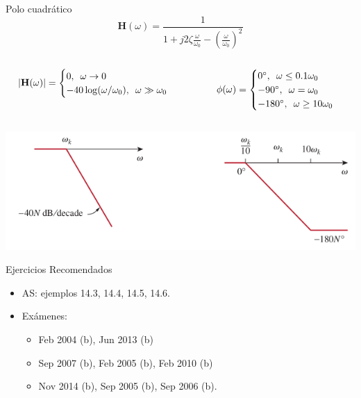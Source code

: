 \documentclass[aspectratio=169, usenames,svgnames,dvipsnames]{beamer}
\newcommand{\fasor}[1]{\mathbf{#1}(\omega)}
\begin{document}
\begin{frame}[label={sec:orgf88b100}]{Polo cuadrático}
\[
  \fasor{H} = \frac{1}{1 + j 2 \zeta \frac{\omega}{\omega_0} - \left(\frac{\omega}{\omega_0}\right)^2} 
\]

\begin{columns}
\begin{column}{0.55\columnwidth}
\[
  |\fasor{H}| = 
  \begin{cases}
  0, \enskip \omega \to 0\\
  - 40 \log (\omega/\omega_0), \enskip \omega \gg \omega_0\\
  \end{cases}
\]
\end{column}

\begin{column}{0.45\columnwidth}
\[
  \phi(\omega) = 
  \begin{cases}
    \ang{0},\enskip \omega \leq 0.1\omega_0\\
    - \ang{90}, \enskip \omega = \omega_0\\
    - \ang{180}, \enskip \omega \geq 10 \omega_0
  \end{cases}
\]
\end{column}
\end{columns}


\begin{center}
\includegraphics[height=0.5\textheight]{../figs/BodePoloCuadratico.pdf}
\end{center}
\end{frame}

\begin{frame}[label={sec:org62d6ea8}]{Ejercicios Recomendados}
\begin{itemize}
\item AS: ejemplos 14.3, 14.4, 14.5, 14.6.
\item Exámenes:
\begin{itemize}
\item Feb 2004 (b), Jun 2013 (b)
\item Sep 2007 (b), Feb 2005 (b), Feb 2010 (b)
\item Nov 2014 (b), Sep 2005 (b), Sep 2006 (b).
\end{itemize}
\end{itemize}
\end{frame}
\end{document}
